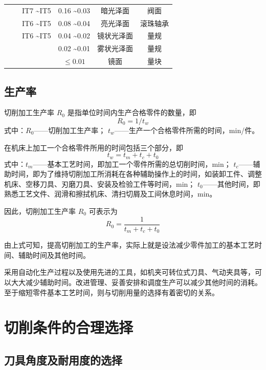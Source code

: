 \documentclass[UTF8]{ctexbook}
\newcommand{\◎}{\ensuremath{\bigcirc}}
\begin{document}
\begin{table}[H]
\begin{tabular}{|c|c|c|c|c|c|}
        \hline
         &  & IT7 \textasciitilde IT5 & 0.16 \textasciitilde 0.03 & 暗光泽面 & 阀面 \\
        & & IT6 \textasciitilde IT5 & 0.08 \textasciitilde 0.04 & 亮光泽面 & 滚珠轴承 \\
        & & IT6 \textasciitilde IT5 & 0.04 \textasciitilde 0.02 & 镜状光泽面 & 量规 \\
        & & & 0.02 \textasciitilde 0.01 & 雾状光泽面 & 量规 \\
        & & & $\leqslant 0.01$ & 镜面 & 量块 \\
        \hline
    \end{tabular}\end{table}

\subsection{生产率}
切削加工生产率 $R_0$ 是指单位时间内生产合格零件的数量，即
$$R_0 = 1/t_w$$
式中：$R_0$——切削加工生产率；
$t_w$——生产一个合格零件所需的时间，min/件。

在机床上加工一个合格零件所用的时间包括三个部分，即
$$t_w = t_m + t_c + t_0$$
式中：$t_m$——基本工艺时间，即加工一个零件所需的总切削时间，min；
$t_c$——辅助时间，即为了维持切削加工所消耗在各种辅助操作上的时间，如装卸工件、调整机床、空移刀具、刃磨刀具、安装及检验工件等时间，min；
$t_0$——其他时间，即熟悉工艺文件、润滑和擦拭机床、清扫切屑及工间休息时间，min。

因此，切削加工生产率 $R_0$ 可表示为
$$R_0 = \frac{1}{t_m + t_c + t_0}$$

由上式可知，提高切削加工的生产率，实际上就是设法减少零件加工的基本工艺时间、辅助时间及其他时间。

采用自动化生产过程以及使用先进的工具，如机夹可转位式刀具、气动夹具等，可以大大减少辅助时间。改进管理、妥善安排和调度生产可以减少其他时间的消耗。至于缩短零件基本工艺时间，则与切削用量的选择有着密切的关系。

\section{切削条件的合理选择}
\subsection{刀具角度及耐用度的选择}
\end{document}
